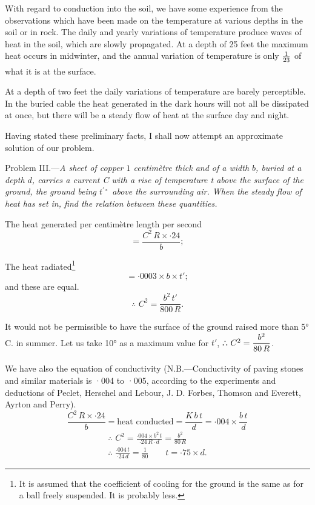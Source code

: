 \documentclass[12pt,oneside]{book}[2021/10/04]
\newcommand{\xp}{\rule[-2.2ex]{0pt}{3.4ex}}
\newcommand{\xpa}{\rule[-1.6ex]{0pt}{3.4ex}}
\begin{document}
With regard to conduction into the soil, we have some
experience from the observations which have been made on the
temperature at various depths in the soil or in rock. The daily
and yearly variations of temperature produce waves of heat in the
soil, which are slowly propagated. At a depth of 25 feet the
maximum heat occurs in midwinter, and the annual variation of
temperature is only \(\xpa\frac{1}{23}\) of what it is at the surface.

At a depth of two feet the daily variations of temperature are
barely perceptible. In the buried cable the heat generated in the
dark hours will not all be dissipated at once, but there will be a
steady flow of heat at the surface day and night.

Having stated these preliminary facts, I shall now attempt an
approximate solution of our problem.

Problem III.—\textit{A sheet of copper \(1\) centimètre thick and of a
width \(b\), buried at a depth \(d\), carries a current C with a rise of
temperature t above the surface of the ground, the ground being
\(t^{\prime\circ}\) above the surrounding air. When the steady flow of heat has
set in, find the relation between these quantities.}
\vspace{.2cm}

The heat generated per centimètre length per second
\[
= \frac{C^2\, R \times ·24}{b};
\]

The heat radiated\footnote
{It is assumed that the coefficient of cooling for the ground is the same
  as for a ball freely suspended. It is probably less.}
\[= ·0003 \times b \times t' ;\]
and these are equal.
\[
\text{∴ } C^2 = \frac{b^2\,t'}{800\, R}.
\]

It would not be permissible to have the surface of the ground
raised more than 5° C. in summer. Let us take 10° as a
maximum value for \(t'\), ∴ \(C^2 = \xp\dfrac{ b^2}{80\, R} \).

We have also the equation of conductivity (N.B.—Conductivity
of paving stones and similar materials is ·004 to ·005,
according to the experiments and deductions of Peclet, Herschel
and Lebour, J. D. Forbes, Thomson and Everett, Ayrton and
Perry).
\[ \frac{ C^2\, R \times ·24}{b} = \text{heat conducted} = \frac{ K\,b\,t}{d} = ·004 \times \frac{b\,t}{d} \]
\begin{gather*}
\text{∴ } C^2 = \frac{·004 \times b^2\,t }{ ·24\, R\cdot d} = \frac{b^2}{80\, R}\\
\text{∴ } \frac{ ·004\,t }{ ·24\,d} = \frac{1}{80} \qquad t = ·75 \times d.
\end{gather*}
\end{document}
